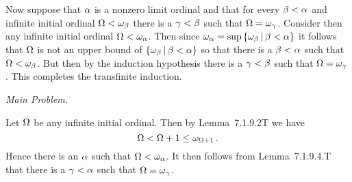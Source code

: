 \begin{questions}
\begin{solution}
{        Now suppose that $\alpha$ is a nonzero limit ordinal and that for every $\beta < \alpha$ and infinite initial ordinal $\Omega < \omega_\beta$ there is a $\gamma < \beta$ such that $\Omega = \omega_\gamma$.
        Consider then any infinite initial ordinal $\Omega < \omega_\alpha$.
        Then since $\omega_\alpha = \sup\left\{ \omega_\beta \,|\, \beta < \alpha \right\}$ it follows that $\Omega$ is not an upper bound of $\left\{ \omega_\beta \,|\, \beta < \alpha \right\}$ so that there is a $\beta < \alpha$ such that $\Omega < \omega_\beta$.
        But then by the induction hypothesis there is a $\gamma < \beta$ such that $\Omega = \omega_\gamma$.
        This completes the transfinite induction. \qedsymbol
    }

    \emph{Main Problem.}

    Let $\Omega$ be any infinite initial ordinal.
    Then by Lemma~7.1.9.2T we have
    $$
    \Omega < \Omega + 1 \leq \omega_{\Omega+1} \,.
    $$
    Hence there is an $\alpha$ such that $\Omega < \omega_\alpha$.
    It then follows from Lemma~7.1.9.4.T that there is a $\gamma < \alpha$ such that $\Omega = \omega_\gamma$. \qedsymbol
\end{solution}

\end{questions}

